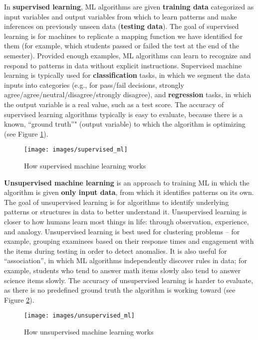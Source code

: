 \documentclass[
]{book}
\begin{document}
In \textbf{supervised learning}, ML algorithms are given \textbf{training data} categorized as input variables and output variables from which to learn patterns and make inferences on previously unseen data (\textbf{testing data}). The goal of supervised learning is for machines to replicate a mapping function we have identified for them (for example, which students passed or failed the test at the end of the semester). Provided enough examples, ML algorithms can learn to recognize and respond to patterns in data without explicit instructions. Supervised machine learning is typically used for \textbf{classification} tasks, in which we segment the data inputs into categories (e.g., for pass/fail decisions, strongly agree/agree/neutral/disagree/strongly disagree), and \textbf{regression} tasks, in which the output variable is a real value, such as a test score. The accuracy of supervised learning algorithms typically is easy to evaluate, because there is a known, ``ground truth''" (output variable) to which the algorithm is optimizing (see Figure \ref{fig:fig5-5}).

\begin{figure}
\texttt{[image: images/supervised\_ml]} \caption{How supervised machine learning works}\label{fig:fig5-5}
\end{figure}

\textbf{Unsupervised machine learning} is an approach to training ML in which the algorithm is given \textbf{only input data}, from which it identifies patterns on its own. The goal of unsupervised learning is for algorithms to identify underlying patterns or structures in data to better understand it. Unsupervised learning is closer to how humans learn most things in life: through observation, experience, and analogy. Unsupervised learning is best used for clustering problems -- for example, grouping examinees based on their response times and engagement with the items during testing in order to detect anomalies. It is also useful for ``association'', in which ML algorithms independently discover rules in data; for example, students who tend to answer math items slowly also tend to answer science items slowly. The accuracy of unsupervised learning is harder to evaluate, as there is no predefined ground truth the algorithm is working toward (see Figure \ref{fig:fig5-6}).

\begin{figure}
\texttt{[image: images/unsupervised\_ml]} \caption{How unsupervised machine learning works}\label{fig:fig5-6}
\end{figure}
\end{document}
